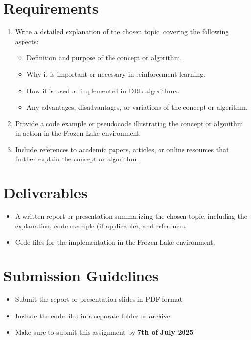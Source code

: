 \documentclass{article}
\begin{document}
\section*{Requirements}
\begin{enumerate}[label=\arabic*.]
    \item Write a detailed explanation of the chosen topic, covering the following aspects:
    \begin{itemize}
        \item Definition and purpose of the concept or algorithm.
        \item Why it is important or necessary in reinforcement learning.
        \item How it is used or implemented in DRL algorithms.
        \item Any advantages, disadvantages, or variations of the concept or algorithm.
    \end{itemize}
    \item Provide a code example or pseudocode illustrating the concept or algorithm in action in the Frozen Lake environment.
    \item Include references to academic papers, articles, or online resources that further explain the concept or algorithm.
\end{enumerate}

\section*{Deliverables}
\begin{itemize}
    \item A written report or presentation summarizing the chosen topic, including the explanation, code example (if applicable), and references.
    \item Code files for the implementation in the Frozen Lake environment.
\end{itemize}

\section*{Submission Guidelines}
\begin{itemize}
    \item Submit the report or presentation slides in PDF format.
    \item Include the code files in a separate folder or archive.
    \item Make sure to submit this assignment by \textbf{7th of July 2025}
\end{itemize}
\end{document}
